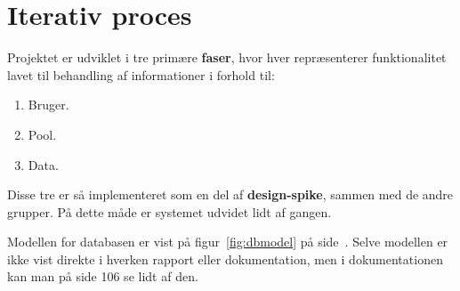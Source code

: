 \section{Iterativ proces}


Projektet er udviklet i tre primære \textbf{faser}, hvor hver repræsenterer funktionalitet lavet til behandling af informationer i forhold til:

\begin{enumerate}
	\item Bruger.
	\item Pool.
	\item Data.
\end{enumerate}

Disse tre er så implementeret som en del af \textbf{design-spike}, sammen med de andre grupper. På dette måde er systemet udvidet lidt af gangen. 

Modellen for databasen er vist på figur~\ref{fig:dbmodel} på side~\pageref{fig:dbmodel}. Selve modellen er ikke vist direkte i hverken rapport eller dokumentation, men i dokumentationen kan man på side 106 se lidt af den.

